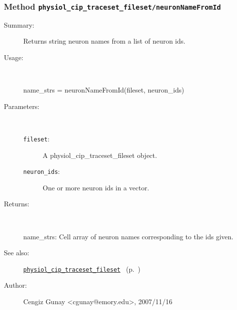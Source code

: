 \subsubsection[Method \texttt{neuronNameFromId}]{Method \texttt{physiol\_cip\_traceset\_fileset/neuronNameFromId}}%
%
\label{ref_physiol_cip_traceset_fileset__neuronNameFromId}%
\hypertarget{ref_physiol_cip_traceset_fileset__neuronNameFromId}{}%
\begin{description}
\item[Summary:]Returns string neuron names from a list of neuron ids.
%
\item[Usage:]~%
\begin{lyxcode}%
name\_strs = neuronNameFromId(fileset, neuron\_ids)
%
\end{lyxcode}%
%
%
\item[Parameters:]~
\begin{description}%
\item[\texttt{fileset}:]
 A physiol\_cip\_traceset\_fileset object.
\item[\texttt{neuron\_ids}:]
 One or more neuron ids in a vector.
\end{description}%
%
\item[Returns:
]~

	name\_strs: Cell array of neuron names corresponding to the ids given.
%
%
\item[See also:]%
\hyperlink{ref_physiol_cip_traceset_fileset}{\texttt{physiol\_cip\_traceset\_fileset}}%
\ (p.~\pageref{ref_physiol_cip_traceset_fileset})%
%
%
\item[Author:]%
Cengiz Gunay <cgunay@emory.edu>, 2007/11/16
%
\end{description}
\methodline%
